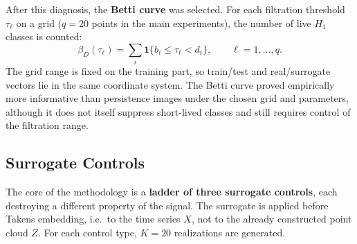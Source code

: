 After this diagnosis, the \textbf{Betti curve} was selected. For each filtration threshold $\tau_\ell$ on a grid ($q=20$ points in the main experiments), the number of live $H_1$ classes is counted:
\begin{equation}\label{eq:betti}
\beta_D(\tau_\ell)=
\sum_i \mathbf{1}\{b_i\le \tau_\ell < d_i\},
\qquad \ell=1,\ldots,q.
\end{equation}
The grid range is fixed on the training part, so train/test and real/surrogate vectors lie in the same coordinate system. The Betti curve proved empirically more informative than persistence images under the chosen grid and parameters, although it does not itself suppress short-lived classes and still requires control of the filtration range.

\subsection{Surrogate Controls}\label{ssec:surrogates}

The core of the methodology is a \textbf{ladder of three surrogate controls}, each destroying a different property of the signal. The surrogate is applied before Takens embedding, i.e.\ to the time series $X$, not to the already constructed point cloud $Z$. For each control type, $K=20$ realizations are generated.

